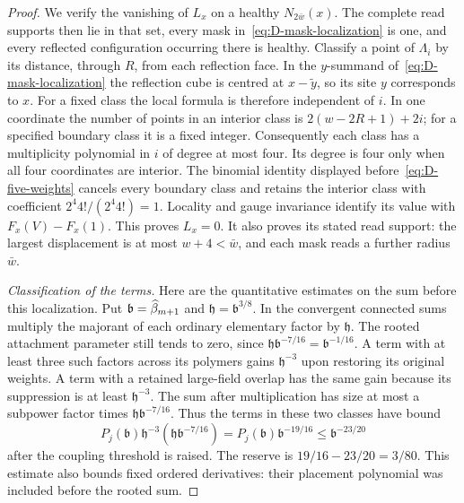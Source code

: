 \begin{proof}
We verify the vanishing of $L_x$ on a healthy $N_{2\bar w}(x)$. The complete read supports then lie in that set, every mask in~\eqref{eq:D-mask-localization} is one, and every reflected configuration occurring there is healthy. Classify a point of $\Lambda_i$ by its distance, through $R$, from each reflection face. In the $y$-summand of~\eqref{eq:D-mask-localization} the reflection cube is centred at $x-\widetilde y$, so its site $y$ corresponds to $x$. For a fixed class the local formula is therefore independent of $i$. In one coordinate the number of points in an interior class is $2(w-2R+1)+2i$; for a specified boundary class it is a fixed integer. Consequently each class has a multiplicity polynomial in $i$ of degree at most four. Its degree is four only when all four coordinates are interior. The binomial identity displayed before~\eqref{eq:D-five-weights} cancels every boundary class and retains the interior class with coefficient $2^4 4!/(2^4 4!)=1$. Locality and gauge invariance identify its value with $F_x(V)-F_x(1)$. This proves $L_x=0$. It also proves its stated read support: the largest displacement is at most $w+4<\bar w$, and each mask reads a further radius $\bar w$.

\emph{Classification of the terms.} Here are the quantitative estimates on the sum before this localization. Put $\mathfrak b=\widehat{\beta}_{m+1}$ and $\mathfrak h=\mathfrak b^{3/8}$. In the convergent connected sums multiply the majorant of each ordinary elementary factor by $\mathfrak h$. The rooted attachment parameter still tends to zero, since $\mathfrak h \mathfrak b^{-7/16}=\mathfrak b^{-1/16}$. A term with at least three such factors across its polymers gains $\mathfrak h^{-3}$ upon restoring its original weights. A term with a retained large-field overlap has the same gain because its suppression is at least $\mathfrak h^{-3}$. The sum after multiplication has size at most a subpower factor times $\mathfrak h \mathfrak b^{-7/16}$. Thus the terms in these two classes have bound
\begin{equation}\label{eq:D-height-gain}
P_j(\mathfrak b)\mathfrak h^{-3}(\mathfrak h \mathfrak b^{-7/16})=P_j(\mathfrak b)\mathfrak b^{-19/16}
\le \mathfrak b^{-23/20}
\end{equation}
after the coupling threshold is raised. The reserve is $19/16-23/20=3/80$. This estimate also bounds fixed ordered derivatives: their placement polynomial was included before the rooted sum.


\end{proof}
